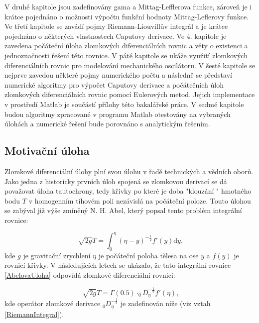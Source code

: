 \documentclass[a4paper,12pt,twoside]{article}
\theoremstyle{definition}
\theoremstyle{remark}
\numberwithin{equation}{section}
\numberwithin{table}{section}
\numberwithin{figure}{section}
\newcommand{\dx}[1]{\mathrm{d} #1}
\begin{document}
V druhé kapitole jsou zadefinovány gama a Mittag-Lefflerova funkce, zároveň je i krátce pojednáno o možnosti výpočtu funkční hodnoty Mittag-Leflerovy funkce. Ve třetí kapitole se zavádí pojmy Riemann-Liouvillův integrál a je krátce pojednáno o některých vlastnostech Caputovy derivace. Ve 4. kapitole je zavedena počáteční úloha zlomkových diferenciálních rovnic a věty o existenci a jednoznačnosti řešení této rovnice. V páté kapitole se ukáže využití zlomkových diferenciálních rovnic pro modelování mechanického oscilátoru. V šesté kapitole se nejprve zavedou některé pojmy numerického počtu a následně se představí numerické algoritmy pro výpočet Caputovy derivace a počátečních úloh zlomkových diferenciálních rovnic pomocí Eulerových metod. Jejich implementace v prostředí Matlab je součástí přílohy této bakalářské práce. V sedmé kapitole budou algoritmy zpracované v programu Matlab otestovány na vybraných úlohách a numerické řešení bude porovnáno s analytickým řešením.

\subsection{Motivační úloha} 
Zlomkové diferenciální úlohy plní svou úlohu v řadě technických a vědních oborů. Jako jedna z historicky prvních úloh spojená se zlomkovou derivací se dá považovat úloha tautochrony, tedy křivky po které je doba "klouzání " hmotného bodu $ T$ v homogenním tíhovém poli nezávislá na počáteční poloze. Touto úlohou se zabýval již výše zmíněný N. H. Abel, který popsal tento problém integrální rovnice:

\begin{equation} \label{AbelovaUloha}
		\sqrt[]{2g}T = \int_{0}^{\eta } \left( \eta - y\right) ^{-\frac{1}{2}} f'\left( y\right) \dx{y},
\end{equation}
kde $g$ je gravitační zrychlení $\eta$ je počáteční poloha tělesa na ose $y$ a $f\left(y\right) $ je  rovnicí křivky.
V následujících letech se ukázalo, že tato integrální rovnice \eqref{AbelovaUloha} odpovídá zlomkové diferenciální rovnici: %

$$
	\sqrt[]{2g}T = \Gamma\left( 0.5 \right) \cdot _{0}\!D_{\eta}^{-\frac{1}{2}} f'\left( \eta \right), 
$$
kde operátor zlomkové derivace $_{0}\!D_{\eta}^{-\frac{1}{2}}$ je zadefinován níže (viz vztah  \eqref{RiemannIntegral}).

\end{document}
